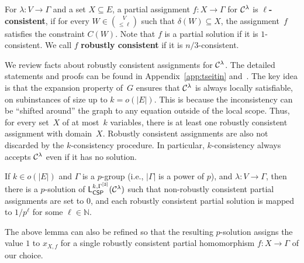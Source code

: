 \documentclass[a4paper,english, thm-restate]{lipics-v2021}
\newcommand{\nat}{\mathbb{N}}
\newcommand{\defining}[1]{\textbf{#1}}
\newcommand{\leqs}{\mathsf{L}}
\newcommand{\cspiso}[3]{\leqs^{#1,#2}_{\mathsf{CSP}}(#3)}
\newcommand{\CosetGrpTmplt}[2]{#1^{[#2]}}
\begin{document}
	
	\begin{definition}
		For $\lambda \colon V \to \Gamma$ and a set $X \subseteq E$, 
		a partial assignment $f \colon X \to \Gamma$ for $\grpCSPf{H}{\Gamma}{\lambda}$ is \defining{$\ell$\nobreakdash-consistent},
		if for every $W \in \binom{V}{\leq \ell}$ such that $\delta(W) \subseteq X$, the assignment~$f$ satisfies the constraint $C(W)$.
		Note that $f$ is a partial solution if it is $1$-consistent.
		We call $f$ \defining{robustly consistent} if it is $n/3$-consistent.
	\end{definition}
	\noindent We review facts about robustly consistent assignments for $\grpCSPf{H}{\Gamma}{\lambda}$. The detailed statements and proofs can be found in Appendix~\ref{app:tseitin} and~\cite{BerkholzGrohe2017}. The key idea is that the expansion property of~$G$ ensures that $\grpCSPf{H}{\Gamma}{\lambda}$ is always locally satisfiable, on subinstances of size up to $k = o(|E|)$.
	This is because the inconsistency can be ``shifted around'' the graph to any equation outside of the local scope. 
	Thus, for every set~$X$ of at most~$k$ variables, there is at least one robustly consistent assignment with domain~$X$. Robustly consistent assignments are also not discarded by the $k$-consistency procedure. 
	In particular, $k$-consistency always accepts $\grpCSPf{H}{\Gamma}{\lambda}$ even if it has no solution. 
	\begin{lemma}
		\label{lem:group-csp-p-solution}
		If $k \in o(|E|)$ and
		$\Gamma$ is a $p$-group (i.e., $|\Gamma|$ is a power of $p$),
		and ${\lambda \colon V \to \Gamma}$,
		then there is a $p$-solution of $\cspiso{k}{\CosetGrpTmplt{\Gamma}{3}}{\grpCSPf{H}{\Gamma}{\lambda}}$ such that non-robustly consistent partial assignments are set to $0$,
		and each robustly consistent partial solution is mapped to $1/p^\ell$ for some $\ell \in \nat$.
	\end{lemma}
	\noindent The above lemma can also be refined so that the resulting $p$-solution assigns the value $1$ to $x_{X,f}$ for a single robustly consistent partial homomorphism $f\colon X \to \Gamma$ of our choice. 
	
	
	
	
	
	
	
	
	
	
	
	
	
	
	
\end{document}
